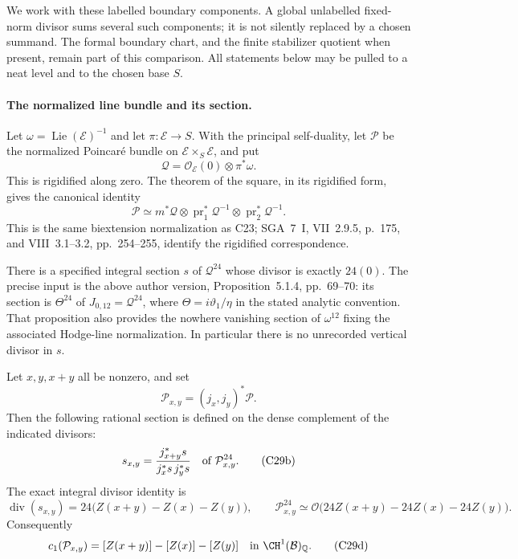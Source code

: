\documentclass[11pt]{article}
\newcommand{\Q}{\mathbb Q}\newcommand{\C}{\mathbb C}\newcommand{\Z}{\mathbb Z}\newcommand{\R}{\mathbb R}\newcommand{\A}{\mathbb A}\newcommand{\OO}{\mathcal O}
\theoremstyle{definition}\newtheorem{definition}[theorem]{Definition}\newtheorem{remark}[theorem]{Remark}
\begin{document}
We work with these labelled boundary components. A global
unlabelled fixed-norm divisor sums several such components;
it is not silently replaced by a chosen summand. The formal
boundary chart, and the finite stabilizer quotient when
present, remain part of this comparison. All statements
below may be pulled to a neat level and to the chosen
base $S$.

\paragraph{The normalized line bundle and its section.}
Let $\omega=\operatorname{Lie}(\mathcal E)^{-1}$ and let
$\pi:\mathcal E\to S$. With the principal self-duality,
let $\mathcal P$ be the normalized Poincar\'e bundle on
$\mathcal E\times_S\mathcal E$, and put
\[
       \mathcal Q=\mathcal O_{\mathcal E}(0)\otimes\pi^*\omega.
\]
This is rigidified along zero. The theorem of the square,
in its rigidified form, gives the canonical identity
\[
 \mathcal P\simeq m^*\mathcal Q\otimes
          \operatorname{pr}_1^*\mathcal Q^{-1}\otimes
          \operatorname{pr}_2^*\mathcal Q^{-1}.
 \tag{C29a}
\]
This is the same biextension normalization as C23;
SGA~7~I, VII~2.9.5, p.~175, and VIII~3.1--3.2,
pp.~254--255, identify the rigidified correspondence.

There is a specified integral section $s$ of
$\mathcal Q^{24}$ whose divisor is exactly $24(0)$.
The precise input is the above author version,
Proposition~5.1.4, pp.~69--70: its section is
$\Theta^{24}$ of $J_{0,12}=\mathcal Q^{24}$,
where $\Theta=i\vartheta_1/\eta$ in the stated analytic
convention. That proposition also provides the nowhere
vanishing section of $\omega^{12}$ fixing the associated
Hodge-line normalization. In particular there is no
unrecorded vertical divisor in $s$.

Let $x,y,x+y$ all be nonzero, and set
\[
        \mathcal P_{x,y}=(j_x,j_y)^*\mathcal P.
\]
Then the following rational section is defined on the
dense complement of the indicated divisors:
\[
  s_{x,y}=\frac{j_{x+y}^*s}{j_x^*s\,j_y^*s}
                 \quad\hbox{of }\mathcal P_{x,y}^{24}.
 \tag{C29b}
\]
The exact integral divisor identity is
\[
 \operatorname{div}(s_{x,y})=
       24\bigl(Z(x+y)-Z(x)-Z(y)\bigr),
 \qquad
 \mathcal P_{x,y}^{24}\simeq
       \mathcal O\bigl(24Z(x+y)-24Z(x)-24Z(y)\bigr).
 \tag{C29c}
\]
Consequently
\[
       c_1(\mathcal P_{x,y})
                  =[Z(x+y)]-[Z(x)]-[Z(y)]
                         \quad\hbox{in }\CH^1(\mathcal B)_\Q.
 \tag{C29d}
\]
\end{document}
